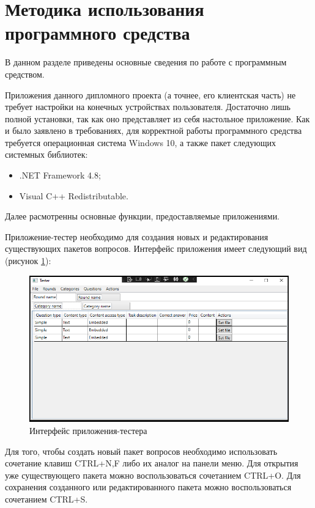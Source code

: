 \section{Методика использования программного средства}
\label{sec:manual}

В данном разделе приведены основные сведения по работе с программным средством. 

Приложения данного дипломного проекта (а точнее, его клиентская часть) не требует настройки на конечных устройствах пользователя. Достаточно лишь
полной установки, так как оно представляет из себя настольное приложение. Как и было заявлено в требованиях, для корректной работы программного средства
требуется операционная система Windows 10, а также пакет следующих системных библиотек:
\begin{itemize}
	\item .NET Framework 4.8;
	\item Visual C++ Redistributable.
\end{itemize} 

Далее расмотренны основные функции, предоставляемые приложениями.

Приложение-тестер необходимо для создания новых и редактирования существующих пакетов вопросов. Интерфейс приложения имеет следующий вид (рисунок \ref{sec:manual:tester}): 

\begin{figure}[!ht]
    \centering
    \includegraphics[scale=0.75]{attachments/tester.png}
    \caption{Интерфейс приложения-тестера}
    \label{sec:manual:tester}
\end{figure}

Для того, чтобы создать новый пакет вопросов необходимо использовать сочетание клавиш CTRL+N,F либо их аналог на панели меню. Для открытия уже существующего пакета можно 
воспользоваться сочетанием CTRL+O. Для сохранения созданного или редактированного пакета можно воспользоваться сочетанием CTRL+S.

